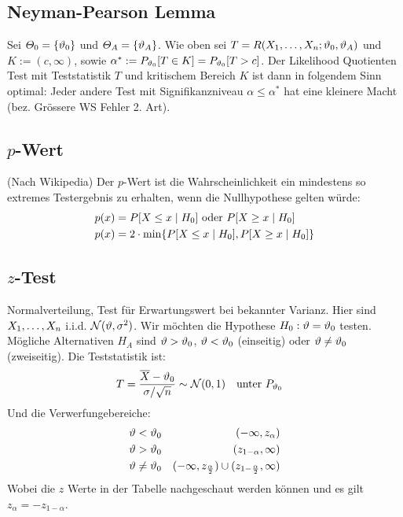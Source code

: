 \subsection*{Neyman-Pearson Lemma}
Sei $\varTheta_0 = \{\vartheta_0\}$ und $\varTheta_A = \{\vartheta_A\}$. Wie oben sei $T =
  R (X_1, \dots, X_n; \vartheta_0, \vartheta_A)$ und $K := (c, \infty)$, sowie $\alpha^* :=
  P_{\vartheta_0}[T \in K] = P_{\vartheta_0}[T > c]$. Der Likelihood Quotienten Test mit
Teststatistik $T$ und kritischem Bereich $K$ ist dann in folgendem Sinn
optimal: Jeder andere Test mit Signifikanzniveau $\alpha \leq \alpha^*$ hat
eine kleinere Macht (bez. Grössere WS Fehler 2. Art).
\subsection*{$p$-Wert}
(Nach Wikipedia) Der $p$-Wert ist die Wahrscheinlichkeit ein mindestens
so extremes Testergebnis zu erhalten, wenn die Nullhypothese gelten würde:
\begin{align*}
  p (x) & = P[X \leq x \; | \; H_0] \text{   oder   } P[X \geq x \; | \; H_0]   \\
  p (x) & = 2 \cdot \min \{ P[X \leq x \; | \; H_0], P[X \geq x \; | \; H_0] \}
\end{align*}
\subsection*{$z$-Test}
Normalverteilung, Test für Erwartungswert bei bekannter Varianz. Hier sind
$X_1, \dots, X_n$ i.i.d. $\mathcal{N} (\vartheta, \sigma^2)$. Wir möchten die
Hypothese $H_0 : \vartheta = \vartheta_0$ testen. Mögliche Alternativen $H_A$ sind $\vartheta >
  \vartheta_0$, $\vartheta < \vartheta_0$ (einseitig) oder $\vartheta \neq \vartheta_0$ (zweiseitig). Die
Teststatistik ist:
\begin{align*}
  T & = \frac{\overline{X} - \vartheta_0}{\sigma / \sqrt{n}} \sim \mathcal{N} (0, 1)
    &                                                                               & \text{unter } P_{\vartheta_0}
\end{align*}
Und die Verwerfungebereiche:
\begin{align*}
  \vartheta < \vartheta_0    &  & (-\infty, z_\alpha)                                                      \\
  \vartheta > \vartheta_0    &  & (z_{1 - \alpha}, \infty)                                                 \\
  \vartheta \neq \vartheta_0 &  & (-\infty, z_{\frac{\alpha}{2}}) \cup  (z_{1 - \frac{\alpha}{2}}, \infty)
\end{align*}
Wobei die $z$ Werte in der Tabelle nachgeschaut werden können
und es gilt $z_\alpha = - z_{1 - \alpha}$.
